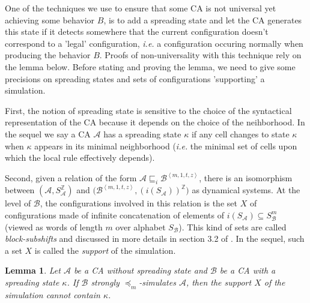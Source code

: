 \documentclass[a4paper]{elsarticle}
\def\qed{\relax\ifmmode\hskip2em \blacksquare\else\unskip\nobreak\hfill\hskip1em $\blacksquare$\fi}
\newcommand{\ZZ}{\mathbb{Z}}
\newcommand{\ACA}{\mathcal{A}}
\newcommand{\ACB}{\mathcal{B}}
\newcommand{\ACC}{\mathcal{C}}
\newcommand\alphabe[1]{S_{#1}}
\newcommand{\alphA}{\alphabe{\ACA}}
\newcommand{\alphB}{\alphabe{\ACB}}
\newcommand\sac{\sqsubseteq}
\newcommand{\fac}{\trianglelefteq}
\newcommand{\facsac}{\fac\!\sac}
\newcommand\bulk[2]{{#1}^{\left\langle{#2}\right\rangle}}
\newcommand{\simu}{\preccurlyeq}
\newcommand{\facsacsimu}{\simu_m}
\newtheorem{lm}{Lemma}[section]
\begin{document}
One of the techniques we use to ensure that some CA is not universal
yet achieving some behavior $B$, is to add a spreading state and let
the CA generates this state if it detects somewhere that the current
configuration doesn't correspond to a 'legal' configuration,
\textit{i.e.} a configuration occuring normally when producing the
behavior $B$.  Proofs of non-universality with this technique rely on
the lemma below. Before stating and proving the lemma, we need to give
some precisions on spreading states and sets of configurations
'supporting' a simulation.

First, the notion of spreading state is sensitive to the choice of the
syntactical representation of the CA because it depends on the choice
of the neihborhood. In the sequel we say a CA $\ACA$ has a spreading
state $\kappa$ if any cell changes to state $\kappa$ when $\kappa$
appears in its minimal neighborhood (\textit{i.e.} the minimal set of
cells upon which the local rule effectively depends).

Second, given a relation of the form
${\ACA\sac_i\bulk{\ACB}{m,1,t,z}}$, there is an isomorphism between
${(\ACA,\alphA^\ZZ)}$ and ${\bigl(\bulk{\ACB}{m,1,t,z},
  (i(\alphA))^\ZZ\bigr)}$ as dynamical systems. At the level of
$\ACB$, the configurations involved in this relation is the set $X$ of
configurations made of infinite concatenation of elements of
${i(\alphA)\subseteq\alphB^m}$ (viewed as words of length $m$ over
alphabet $\alphB$). This kind of sets are called \emph{block-subshifts}
and discussed in more details in section 3.2 of \cite{bulking1}. In
the sequel, such a set $X$ is called the \emph{support} of the
simulation.

\begin{lm}
  \label{lm:nospread}
  Let $\ACA$ be a CA without spreading state and $\ACB$ be a CA with a
  spreading state $\kappa$. If $\ACB$ strongly $\facsacsimu$-simulates
  $\ACA$, then the support $X$ of the simulation cannot contain
  $\kappa$.
\end{lm}
\end{document}
